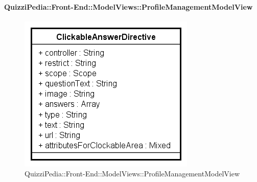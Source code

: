 	\paragraph{QuizziPedia::Front-End::ModelViews::ProfileManagementModelView}
	
	\label{QuizziPedia::Front-End::ModelViews::ProfileManagementModelView}
	
	\begin{figure}[ht]
		\centering
		\includegraphics[scale=0.5,keepaspectratio]{UML/Classi/Front-End/QuizziPedia_Front-end_Templates_ClickableAnswerTemplate.png}
		\caption{QuizziPedia::Front-End::ModelViews::ProfileManagementModelView}
	\end{figure} \FloatBarrier
	
